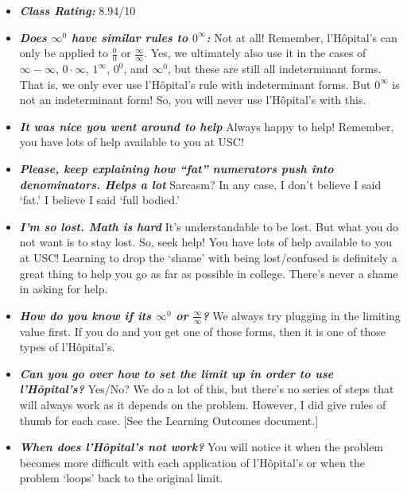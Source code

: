 \documentclass[11pt,letterpaper]{article}
\begin{document}
\begin{itemize}
\item {\bfseries\itshape Class Rating:} 8.94/10

\item {\bfseries\itshape Does $\infty^0$ have similar rules to $0^\infty$:} Not at all! Remember, l'H\^{o}pital's can only be applied to $\frac{0}{0}$ or $\frac{\infty}{\infty}$. Yes, we ultimately also use it in the cases of $\infty - \infty$, $0 \cdot \infty$, $1^\infty$, $0^0$, and $\infty^0$, but these are still all indeterminant forms. That is, we only ever use l'H\^{o}pital's rule with indeterminant forms. But $0^\infty$ is not an indeterminant form! So, you will never use l'H\^{o}pital's with this.

\item {\bfseries\itshape It was nice you went around to help} Always happy to help! Remember, you have lots of help available to you at USC!

\item {\bfseries\itshape Please, keep explaining how ``fat'' numerators push into denominators. Helps a lot} Sarcasm? In any case, I don't believe I said `fat.' I believe I said `full bodied.'

\item {\bfseries\itshape I'm so lost. Math is hard} It's understandable to be lost. But what you do not want is to stay lost. So, seek help! You have lots of help available to you at USC! Learning to drop the `shame' with being lost/confused is definitely a great thing to help you go as far as possible in college. There's never a shame in asking for help.

\item {\bfseries\itshape How do you know if its $\infty^0$ or $\frac{\infty}{\infty}$?} We always try plugging in the limiting value first. If you do and you get one of those forms, then it is one of those types of l'H\^{o}pital's.

\item {\bfseries\itshape Can you go over how to set the limit up in order to use l'H\^{o}pital's?} Yes/No? We do a lot of this, but there's no series of steps that will always work as it depends on the problem. However, I did give rules of thumb for each case. [See the Learning Outcomes document.]

\item {\bfseries\itshape When does l'H\^opital's not work?} You will notice it when the problem becomes more difficult with each application of l'H\^{o}pital's or when the problem `loops' back to the original limit. 


\end{itemize}
\end{document}
